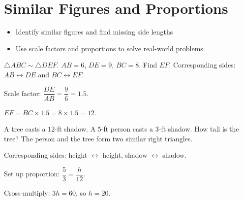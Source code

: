 \section{Similar Figures and Proportions}

\begin{stepGoal}
\begin{itemize}
    \item Identify similar figures and find missing side lengths
    \item Use scale factors and proportions to solve real-world problems
\end{itemize}
\end{stepGoal}

\begin{stepVocabBox}
\end{stepVocabBox}

\begin{stepsCard}
\end{stepsCard}

\begin{stepExample}{$\triangle ABC \sim \triangle DEF$. $AB = 6$, $DE = 9$, $BC = 8$. Find $EF$.}
     Corresponding sides: $AB \leftrightarrow DE$ and $BC \leftrightarrow EF$.

     Scale factor: $\dfrac{DE}{AB} = \dfrac{9}{6} = 1.5$.

     $EF = BC \times 1.5 = 8 \times 1.5 = 12$.
\end{stepExample}

\begin{stepExample}{A tree casts a $12$-ft shadow. A $5$-ft person casts a $3$-ft shadow. How tall is the tree?}
     The person and the tree form two similar right triangles.\par
    Corresponding sides: height $\leftrightarrow$ height, shadow $\leftrightarrow$ shadow.

     Set up proportion: $\dfrac{5}{3} = \dfrac{h}{12}$.

     Cross-multiply: $3h = 60$, so $h = 20$.
\end{stepExample}

